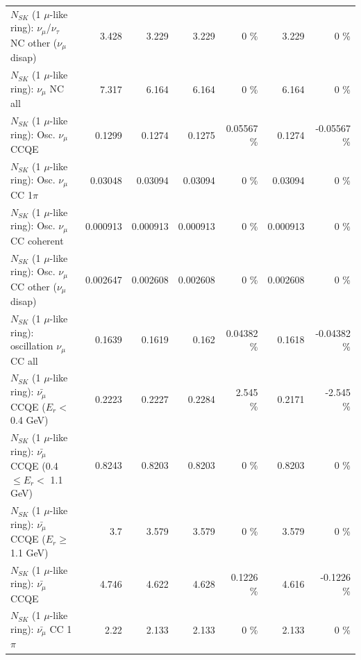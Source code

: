 \begin{table}
\begin{tabular}{| l | r | r | r  r | r  r |}
   $N_{SK}$ (1 $\mu$-like ring): $\nu_\mu$/$\nu_\tau$ NC other ($\nu_\mu$ disap) &           3.428 &           3.229 &           3.229 &        0 \%  &           3.229 &        0 \%  \\ 
                                $N_{SK}$ (1 $\mu$-like ring): $\nu_{\mu}$ NC all &           7.317 &           6.164 &           6.164 &        0 \%  &           6.164 &        0 \%  \\ 
\hline
\hline
                               $N_{SK}$ (1 $\mu$-like ring): Osc. $\nu_\mu$ CCQE &          0.1299 &          0.1274 &          0.1275 &  0.05567 \%  &          0.1274 & -0.05567 \%  \\ 
                          $N_{SK}$ (1 $\mu$-like ring): Osc. $\nu_\mu$ CC 1$\pi$ &         0.03048 &         0.03094 &         0.03094 &        0 \%  &         0.03094 &        0 \%  \\ 
                        $N_{SK}$ (1 $\mu$-like ring): Osc. $\nu_\mu$ CC coherent &        0.000913 &        0.000913 &        0.000913 &        0 \%  &        0.000913 &        0 \%  \\ 
         $N_{SK}$ (1 $\mu$-like ring): Osc. $\nu_\mu$ CC other ($\nu_\mu$ disap) &        0.002647 &        0.002608 &        0.002608 &        0 \%  &        0.002608 &        0 \%  \\ 
                      $N_{SK}$ (1 $\mu$-like ring): oscillation $\nu_\mu$ CC all &          0.1639 &          0.1619 &           0.162 &  0.04382 \%  &          0.1618 & -0.04382 \%  \\ 
\hline
\hline
          $N_{SK}$ (1 $\mu$-like ring): $\bar{\nu_\mu}$ CCQE ($E_{r} <$ 0.4 GeV) &          0.2223 &          0.2227 &          0.2284 &    2.545 \%  &          0.2171 &   -2.545 \%  \\ 
 $N_{SK}$ (1 $\mu$-like ring): $\bar{\nu_\mu}$ CCQE (0.4 $\leq E_{r} <$ 1.1 GeV) &          0.8243 &          0.8203 &          0.8203 &        0 \%  &          0.8203 &        0 \%  \\ 
       $N_{SK}$ (1 $\mu$-like ring): $\bar{\nu_\mu}$ CCQE ($E_{r} \geq$ 1.1 GeV) &             3.7 &           3.579 &           3.579 &        0 \%  &           3.579 &        0 \%  \\ 
\hline
                              $N_{SK}$ (1 $\mu$-like ring): $\bar{\nu_\mu}$ CCQE &           4.746 &           4.622 &           4.628 &   0.1226 \%  &           4.616 &  -0.1226 \%  \\ 
                         $N_{SK}$ (1 $\mu$-like ring): $\bar{\nu_\mu}$ CC 1$\pi$ &            2.22 &           2.133 &           2.133 &        0 \%  &           2.133 &        0 \%  \\ 

\end{tabular}
\end{table}
